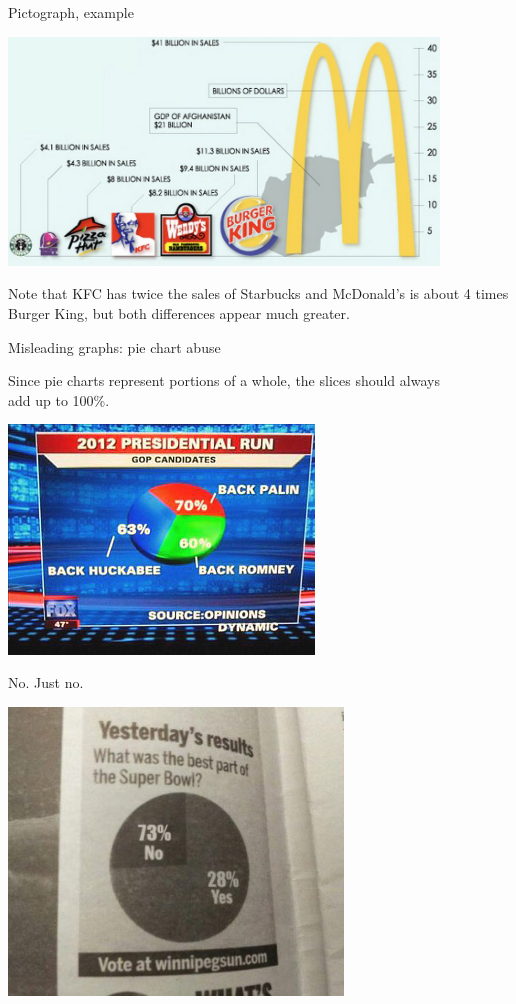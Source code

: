 \documentclass{beamer}
\begin{document}
\begin{frame}{Pictograph, example}
\begin{center}
\includegraphics[width=4.5in]{../images/ch02_fastfood_pictograph}
\end{center}
\begin{block}{}
Note that KFC has twice the sales of Starbucks and McDonald's is about 4 times Burger King, but both differences appear much greater.
\end{block}
\end{frame}

\begin{frame}{Misleading graphs: pie chart abuse}
\begin{block}{}
Since pie charts represent portions of a whole, the slices should always\\ add up to 100\%.
\end{block}
\pause
\begin{center}
\includegraphics[width=3.2in]{../images/ch02_bad_piechart}
\end{center}

\end{frame}

\begin{frame}{No. Just no.}
\begin{center}
\includegraphics[width=3.5in]{../images/ch02_sb_piechart}
\end{center}
\end{frame}
\end{document}
